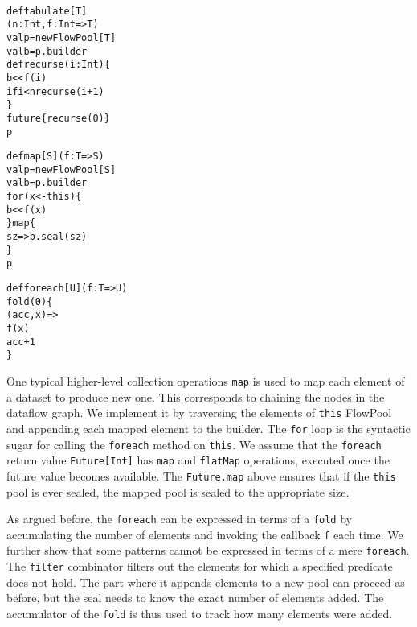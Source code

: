 \documentclass[runningheads,a4paper]{llncs}
\begin{document}
\noindent
\begin{minipage}[b]{4.2 cm}
\begin{alltt}
{\scriptsize
def tabulate[T]
  (n: Int, f: Int => T)
  val p = new FlowPool[T]
  val b = p.builder
  def recurse(i: Int) \{
    b << f(i)
    if i < n recurse(i + 1)
  \}
  future \{ recurse(0) \}
  p
}
\end{alltt}
\end{minipage}\begin{minipage}[b]{4 cm}
\begin{alltt}
{\scriptsize
def map[S](f: T => S)
  val p = new FlowPool[S]
  val b = p.builder
  for (x <- this) \{
    b << f(x)
  \} map \{
    sz => b.seal(sz)
  \}
  p

}
\end{alltt}
\end{minipage}
\begin{minipage}[b]{2.5 cm}
\begin{alltt}
{\scriptsize
def foreach[U](f: T => U)
  fold(0) \{
    (acc, x) =>
    f(x)
    acc + 1
  \}




}
\end{alltt}
\end{minipage}

One typical higher-level collection operations \verb=map= is used to
map each element of a dataset to produce new one.
This corresponds to chaining the nodes in the dataflow graph.
We implement it by traversing the elements of \verb=this= FlowPool and
appending each mapped element to the builder.
The \verb=for= loop is the syntactic sugar for calling the
\verb=foreach= method on \verb=this=.
We assume that the \verb=foreach= return value \verb=Future[Int]=
has \verb=map= and \verb=flatMap= operations, executed
once the future value becomes available.
The \verb=Future.map= above ensures that if the \verb=this= pool is ever
sealed, the mapped pool is sealed to the appropriate size.

As argued before, the \verb=foreach= can be expressed in terms of a
\verb=fold= by accumulating the number of elements and invoking the
callback \verb=f= each time.
We further show that some patterns cannot be expressed in terms of a mere
\verb=foreach=.
The \verb=filter= combinator filters out the elements for which a
specified predicate does not hold.
The part where it appends elements to a new pool can proceed as
before, but the seal needs to know the exact number of elements added.
The accumulator of the \verb=fold= is thus used to track how many
elements were added.
\end{document}
